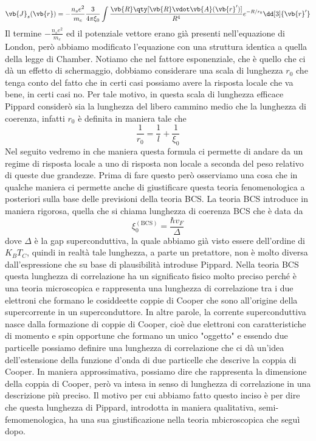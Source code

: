 \begin{equation}
   \vb{J}_s(\vb{r})
   =-\frac{n_s e^2}{m_e} \frac{3}{4\pi \xi_0} \int \frac{\vb{R} \qty[ \vb{R} \vdot \vb{A}(\vb{r}') ] }{R^4} e^{-R/r_0} \dd[3]{\vb{r}'}
   \label{eq:modello_di_Pippard}
\end{equation}
Il termine $-\frac{n_s e^2}{m_e}$ ed il potenziale vettore erano già presenti nell'equazione di London, però abbiamo modificato l'equazione con una struttura identica a quella della legge di Chamber. Notiamo che nel fattore esponenziale, che è quello che ci dà un effetto di schermaggio, dobbiamo considerare una scala di lunghezza $r_0$ che tenga conto del fatto che in certi casi possiamo avere la risposta locale che va bene, in certi casi no. Per tale motivo, in questa scala di lunghezza efficace Pippard considerò sia la lunghezza del libero cammino medio che la lunghezza di coerenza, infatti $r_0$ è definita in maniera tale che
\begin{equation*}
   \frac{1}{r_0}
   =\frac{1}{l} + \frac{1}{\xi_0}
\end{equation*}
Nel seguito vedremo in che maniera questa formula ci permette di andare da un regime di risposta locale a uno di risposta non locale a seconda del peso relativo di queste due grandezze. Prima di fare questo però osserviamo una cosa che in qualche maniera ci permette anche di giustificare questa teoria fenomenologica a posteriori sulla base delle previsioni della teoria BCS. La teoria BCS introduce in maniera rigorosa, quella che si chiama lunghezza di coerenza BCS che è data da
\begin{equation*}
   \xi_0^{(\text{BCS})}
   =\frac{\hbar v_F}{\Delta}
\end{equation*}
dove $\Delta$ è la gap superconduttiva, la quale abbiamo già visto essere dell'ordine di $K_B T_C$, quindi in realtà tale lunghezza, a parte un pretattore, non è molto diversa dall'espressione che su base di plausibilità introduse Pippard. Nella teoria BCS questa lunghezza di correlazione ha un significato fisico molto preciso perché è una teoria microscopica e rappresenta una lunghezza di correlazione tra i due elettroni che formano le cosiddeette coppie di Cooper che sono all'origine della supercorrente in un superconduttore. In altre parole, la corrente superconduttiva nasce dalla formazione di coppie di Cooper, cioè due elettroni con caratteristiche di momento e spin opportune che formano un unico "oggetto" e essendo due particelle possiamo definire una lunghezza di correlazione che ci dà un'idea dell'estensione della funzione d'onda di due particelle che descrive la coppia di Cooper. In maniera approssimativa, possiamo dire che rappresenta la dimensione della coppia di Cooper, però va intesa in senso di lunghezza di correlazione in una descrizione più preciso. Il motivo per cui abbiamo fatto questo inciso è per dire che questa lunghezza di Pippard, introdotta in maniera qualitativa, semi-femomenologica, ha una sua giustificazione nella teoria mbicroscopica che seguì dopo.\\
